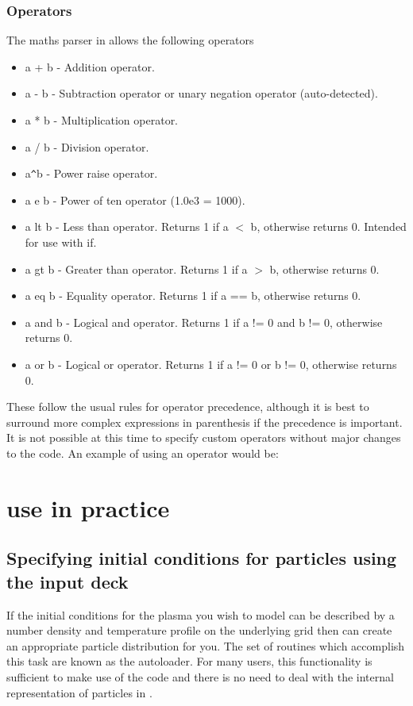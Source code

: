 \subsubsection{Operators}
The maths parser in {\EPOCH} allows the following operators
\begin{itemize}
\item a + b - Addition operator.
\item a - b - Subtraction operator or unary negation operator (auto-detected).
\item a * b - Multiplication operator.
\item a / b - Division operator.
\item a\verb|^|b - Power raise operator.
\item a e b - Power of ten operator (1.0e3 = 1000).
\item a lt b - Less than operator. Returns 1 if a $<$ b, otherwise returns
  0. Intended for use with if.
\item a gt b - Greater than operator. Returns 1 if a $>$ b, otherwise returns 0.
\item a eq b - Equality operator. Returns 1 if a == b, otherwise returns 0.
\item a and b - Logical and operator. Returns 1 if a != 0 and b != 0,
  otherwise returns 0.
\item a or b - Logical or operator. Returns 1 if a != 0 or b != 0, otherwise
  returns 0.
\end{itemize}

These follow the usual rules for operator precedence, although it is best
to surround more complex expressions in parenthesis if the precedence
is important.
It is not possible at this time to specify custom operators without major
changes to the code. An example of using an operator would be:\\
\indent{}


\section{\texorpdfstring
  {{\EPOCH} use in practice}
  {{EPOCH} use in practice}}
\label{sec:usage}

\subsection{Specifying initial conditions for particles using the input deck}

If the initial conditions for the plasma you wish to model can be described
by a number density and temperature profile on the underlying grid then
{\EPOCH} can create an appropriate particle distribution for you. The
set of routines which accomplish this task are known as the autoloader.
For many users, this functionality is sufficient to make use of the
code and there is no need to deal with the internal representation of
particles in {\EPOCH}.

